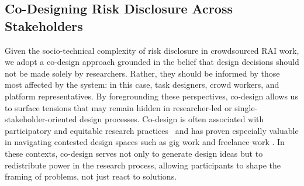 

\subsection{Co-Designing Risk Disclosure Across Stakeholders}
Given the socio-technical complexity of risk disclosure in crowdsourced RAI work, we adopt a co-design approach grounded in the belief that design decisions should not be made solely by researchers. Rather, they should be informed by those most affected by the system: in this case, task designers, crowd workers, and platform representatives. By foregrounding these perspectives, co-design allows us to surface tensions that may remain hidden in researcher-led or single-stakeholder-oriented design processes.
Co-design is often associated with participatory and equitable research practices~\cite{muller_participatory_nodate} and has proven especially valuable in navigating contested design spaces such as gig work and freelance work \cite{huang2024design, hsieh_designing_2023}. In these contexts, co-design serves not only to generate design ideas but to redistribute power in the research process, allowing participants to shape the framing of problems, not just react to solutions.

